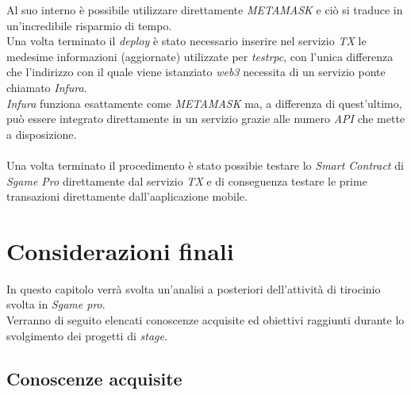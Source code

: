 \documentclass[11pt]{thesistemp}
\begin{document}
Al suo interno è possibile utilizzare direttamente \textit{METAMASK} e ciò si traduce in un'incredibile risparmio di tempo.\\
Una volta terminato il \textit{deploy} è stato necessario inserire nel servizio \textit{TX} le medesime informazioni (aggiornate) utilizzate per \textit{testrpc}, con l'unica differenza che l'indirizzo con il quale viene istanziato \textit{web3} necessita di un servizio ponte chiamato \textit{Infura}.\\
\textit{Infura} funziona esattamente come \textit{METAMASK} ma, a differenza di quest'ultimo, può essere integrato direttamente in un servizio grazie alle numero \textit{API} che mette a disposizione.\\\\
Una volta terminato il procedimento è stato possibie testare lo \textit{Smart Contract} di  \textit{Sgame Pro} direttamente dal servizio \textit{TX} e di conseguenza testare le prime transazioni direttamente dall'aaplicazione mobile.

\section{Considerazioni finali}

In questo capitolo verrà svolta un’analisi a posteriori dell’attività di tirocinio svolta in \textit{Sgame pro}.\\
Verranno di seguito elencati conoscenze acquisite ed obiettivi raggiunti durante lo svolgimento dei progetti di \textit{stage}.

\subsection{Conoscenze acquisite}
\end{document}
